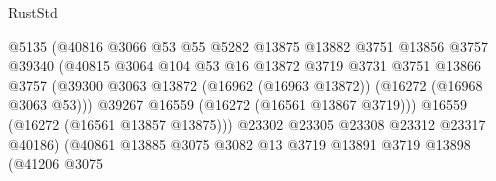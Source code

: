 \begin{lexlean}{RustStd}
\begin{coremodule}
                                          @5135
                                          (@40816
                                            @3066
                                            @53
                                            @55
                                            @5282
                                            @13875
                                            @13882
                                            @3751
                                            @13856
                                            @3757
                                            @39340
                                            (@40815
                                              @3064
                                              @104
                                              @53
                                              @16
                                              @13872
                                              @3719
                                              @3731
                                              @3751
                                              @13866
                                              @3757
                                              (@39300
                                                @3063
                                                @13872
                                                (@16962 (@16963 @13872))
                                                (@16272 (@16968 @3063 @53)))
                                              @39267
                                              @16559
                                              (@16272 (@16561 @13867 @3719)))
                                            @16559
                                            (@16272 (@16561 @13857 @13875)))
                                          @23302
                                          @23305
                                          @23308
                                          @23312
                                          @23317
                                          @40186)
                                        (@40861
                                          @13885
                                          @3075
                                          @3082
                                          @13
                                          @3719
                                          @13891
                                          @3719
                                          @13898
                                          (@41206
                                            @3075

\end{coremodule}
\end{lexlean}
